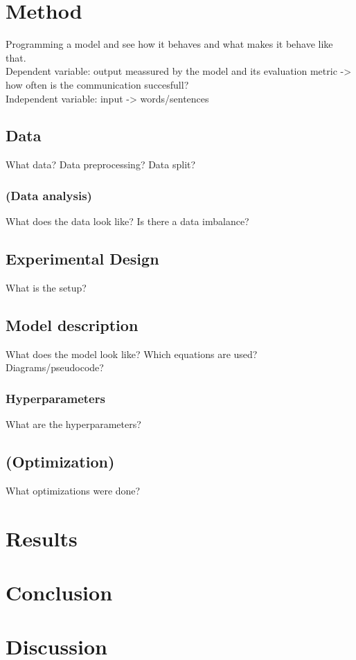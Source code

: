 \documentclass[a4paper, 12pt]{report}
\begin{document}
\chapter{Method}
Programming a model and see how it behaves and what makes it behave like that. \\
Dependent variable: output meassured by the model and its evaluation metric -> how often is the communication succesfull? \\
Independent variable: input -> words/sentences \\

\section{Data}
What data? Data preprocessing? Data split?

\subsection{(Data analysis)}
What does the data look like? Is there a data imbalance?

\section{Experimental Design}
What is the setup?

\section{Model description}
What does the model look like? Which equations are used? Diagrams/pseudocode?

\subsection{Hyperparameters}
What are the hyperparameters?

\section{(Optimization)}
What optimizations were done?

\chapter{Results}


\chapter{Conclusion}


\chapter{Discussion}



\end{document}

